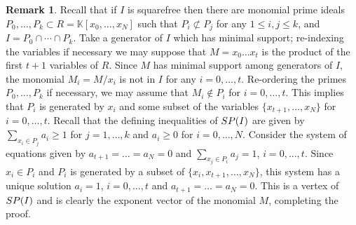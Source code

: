 \documentclass[12pt, reqno]{amsart}
\numberwithin{equation}{section}
\newcommand{\kk}{\mathbb{K}}
\newcommand{\SP}{{\rm SP}}
\theoremstyle{plain} %
\theoremstyle{definition}
\newtheorem{rem}[thm]{Remark}
\theoremstyle{remark}
\begin{document}
\begin{rem}
Recall that if $I$ is squarefree then there are monomial prime ideals $P_0,\ldots,P_k\subset R=\kk[x_0,\ldots,x_N]$ such that $P_i\not\subset P_j$ for any $1\le i,j\le k$, and $I=P_0\cap\cdots\cap P_k$.  Take a generator of $I$ which has minimal support; re-indexing the variables if necessary we may suppose that $M=x_0\ldots x_t$ is the product of the first $t+1$ variables of $R$.  Since $M$ has minimal support among generators of $I$, the monomial $M_i=M/x_i$ is not in $I$ for any $i=0,\ldots,t$.  Re-ordering the primes $P_0,\ldots,P_k$ if necessary, we may assume that $M_i\notin P_i$ for $i=0,\ldots,t$.  This implies that $P_i$ is generated by $x_i$ and some subset of the variables $\{x_{t+1},\ldots, x_N\}$ for $i=0,\ldots,t$.  Recall that the defining inequalities of $\SP(I)$ are given by $\sum_{x_i\in P_j} a_i \ge 1$ for $j=1,\ldots,k$ and $a_i\ge 0$ for $i=0,\ldots,N$.  Consider the system of equations given by $a_{t+1}=\ldots =a_N=0$ and $\displaystyle \sum_{x_j\in P_i} a_j = 1$, $i=0,\ldots ,t$.  Since $x_i \in P_{i}$ and $P_i$ is generated by a subset of $\{ x_i, x_{t+1}, \ldots ,x_N\}$, this system has a unique solution $a_i = 1$, $i=0,\ldots ,t$ and $a_{t+1}=\ldots =a_N=0$.  This is a vertex of $\SP(I)$ and is clearly the exponent vector of the monomial $M$, completing the proof.
\end{rem}
\end{document}
